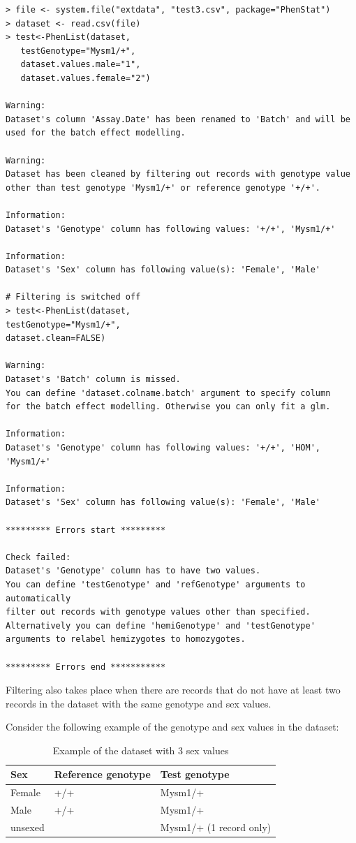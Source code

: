 \documentclass[12pt,a4paper]{article}
\begin{document}
\begingroup
    \fontsize{8pt}{12pt}\selectfont
\begin{verbatim}
> file <- system.file("extdata", "test3.csv", package="PhenStat") 
> dataset <- read.csv(file)
> test<-PhenList(dataset,
   testGenotype="Mysm1/+",
   dataset.values.male="1",
   dataset.values.female="2")

Warning:
Dataset's column 'Assay.Date' has been renamed to 'Batch' and will be used for the batch effect modelling.

Warning:
Dataset has been cleaned by filtering out records with genotype value 
other than test genotype 'Mysm1/+' or reference genotype '+/+'.

Information:
Dataset's 'Genotype' column has following values: '+/+', 'Mysm1/+'

Information:
Dataset's 'Sex' column has following value(s): 'Female', 'Male'

# Filtering is switched off
> test<-PhenList(dataset,
testGenotype="Mysm1/+",
dataset.clean=FALSE)

Warning:
Dataset's 'Batch' column is missed.
You can define 'dataset.colname.batch' argument to specify column 
for the batch effect modelling. Otherwise you can only fit a glm.

Information:
Dataset's 'Genotype' column has following values: '+/+', 'HOM', 'Mysm1/+'

Information:
Dataset's 'Sex' column has following value(s): 'Female', 'Male'

********* Errors start *********

Check failed:
Dataset's 'Genotype' column has to have two values.
You can define 'testGenotype' and 'refGenotype' arguments to automatically 
filter out records with genotype values other than specified. 
Alternatively you can define 'hemiGenotype' and 'testGenotype' arguments to relabel hemizygotes to homozygotes.

********* Errors end ***********
\end{verbatim}
\endgroup

Filtering also takes place when there are records that do not have at least two records in the dataset with the same genotype and sex values. 

Consider the following example of the genotype and sex values in the dataset:
\begin{table}[!h]
\begin{center}
\begin{tabular}{| l | l | l | }
  \hline
Sex&Reference genotype&Test genotype\\\hline
Female&+\slash +&Mysm1\slash +\\
Male&+\slash +&Mysm1\slash +\\
unsexed& &Mysm1\slash + (1 record only)\\
\hline  
\end{tabular}
\caption{Example of the dataset with 3 sex values}\label{table:04}
\end{center}
\end{table}
\end{document}
